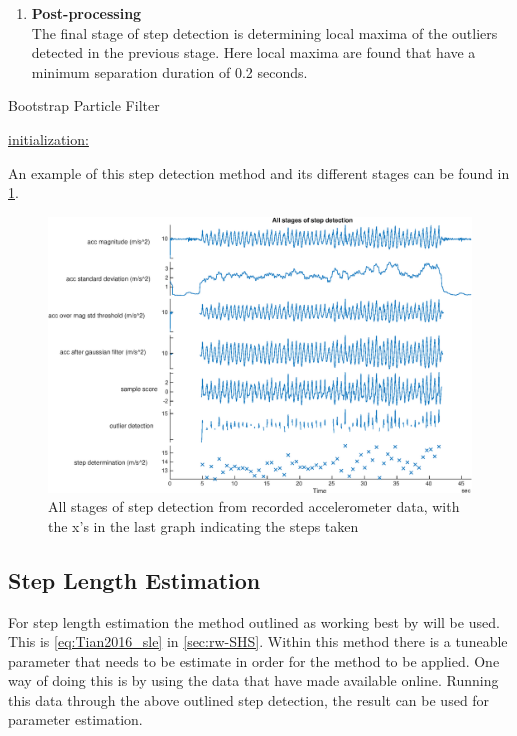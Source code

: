\begin{enumerate}
	
	\item \textbf{Post-processing} \\
	The final stage of step detection is determining local maxima of the outliers detected in the previous stage. Here local maxima are found that have a minimum separation duration of 0.2 seconds.
	
\end{enumerate}

\begin{algorithm}[]
	\SetAlgoLined
	\caption{Bootstrap Particle Filter}
	\label{algo:step_detect}
	\underline{initialization:}\\
\end{algorithm}

An example of this step detection method and its different stages can be found in \cref{fig:all_stages_of_step_detection}.

\begin{figure}[H]
	\centering
	\includegraphics[width=1\linewidth]{images/20200924_1204_All_stages_of_step_detection}
	\caption[All stages of step detection ]{All stages of step detection from recorded accelerometer data, with the x's in the last graph indicating the steps taken }
	\label{fig:all_stages_of_step_detection}
\end{figure}
\subsection*{Step Length Estimation}
For step length estimation the method outlined as working best by \cite{Vezocnik2019} will be used. This is \eqref{eq:Tian2016_sle} in \cref{sec:rw-SHS}. Within this method there is a tuneable parameter that needs to be estimate in order for the method to be applied. One way of doing this is by using the data that \cite{Vezocnik2019} have made available online. Running this data through the above outlined step detection, the result can be used for parameter estimation.

